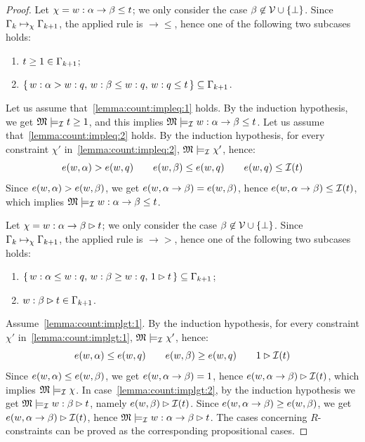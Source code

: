 \begin{proof}
 
 Let $\chi= w:\alpha\to \beta \leq t$; we only consider the case
 $\beta\not\in\mathcal{V}\cup\{\bot\}$.  Since $\Gamma_k\mapsto_{\chi} \Gamma_{k+1}$, the
 applied rule is $\to\leq$, hence one of the following two subcases
 holds:
 
 \begin{enumerate}[label=(B\arabic*), ref=(B\arabic*),leftmargin=*]
 \item\label{lemma:count:impleq:1}
   $t\geq 1\in \Gamma_{k+1}$;
   
 \item\label{lemma:count:impleq:2}
   $\{\,w:\alpha> w :q,\,w:\beta\leq w:q,\,w:q\leq t\,\} \subseteq \Gamma_{k+1}$.
 \end{enumerate}
 Let us assume that~\ref{lemma:count:impleq:1} holds.  By the
 induction hypothesis, we get $\mathfrak{M}\models_{\mathcal{I}} t\geq 1$, and this
 implies $\mathfrak{M}\models_{\mathcal{I}} w:\alpha\to \beta \leq t$.  Let us assume
 that~\ref{lemma:count:impleq:2} holds.  By the induction hypothesis,
 for every constraint $\chi'$ in~\ref{lemma:count:impleq:2},
 $\mathfrak{M}\models_{\mathcal{I}} \chi'$, hence:
 \[
 e(w,\alpha) > e(w,q) \qquad e(w,\beta) \leq e(w,q) \qquad e(w,q) \leq \mathcal{I}(t)
 \]  
 Since $e(w,\alpha) > e(w,\beta)$, we get $e(w,\alpha\to \beta) = e(w,\beta)$, hence
 $e(w,\alpha\to \beta) \leq \mathcal{I}(t)$, which implies $\mathfrak{M}\models_{\mathcal{I}} w:\alpha\to
 \beta \leq t$.


 Let $\chi= w:\alpha\to \beta \rhd t$; we only consider the case
 $\beta\not\in\mathcal{V}\cup\{\bot\}$.  Since $\Gamma_k\mapsto_{\chi} \Gamma_{k+1}$, the
 applied rule is $\to\gt$, hence one of the following two subcases
 holds:
 
 \begin{enumerate}[label=(C\arabic*), ref=(C\arabic*),leftmargin=*]
 \item\label{lemma:count:implgt:1}
   $\{\,w:\alpha \leq w:q,\,w:\beta\geq  w:q,\,1\rhd t\,\}\subseteq\Gamma_{k+1}$;
   
 \item\label{lemma:count:implgt:2}
   $w:\beta\rhd t\in\Gamma_{k+1}$.
 \end{enumerate}
 
 \noindent
 Assume~\ref{lemma:count:implgt:1}.  By the induction hypothesis, for
 every constraint $\chi'$ in~\ref{lemma:count:implgt:1},
 $\mathfrak{M}\models_{\mathcal{I}} \chi'$, hence:
 \[
 e(w,\alpha) \leq  e(w,q) \qquad e(w,\beta) \geq e(w,q) \qquad 1 \rhd \mathcal{I}(t)
 \]  
 Since $e(w,\alpha)\leq e(w,\beta)$, we get $e(w,\alpha\to \beta)=1$, hence
 $e(w,\alpha\to \beta)\rhd \mathcal{I}(t)$, which implies $\mathfrak{M}\models_{\mathcal{I}}\chi$.  In
 case~\ref{lemma:count:implgt:2}, by the induction hypothesis we get
 $\mathfrak{M}\models_{\mathcal{I}} w:\beta\rhd t$, namely $e(w,\beta)\rhd\mathcal{I}(t)$.  Since
 $e(w,\alpha\to\beta)\geq e(w,\beta)$, we get $e(w,\alpha\to\beta)\rhd\mathcal{I}(t)$, hence
 $\mathfrak{M}\models_{\mathcal{I}} w:\alpha\to \beta \rhd t$.  The cases concerning
 $R$-constraints can be proved as the corresponding propositional
 cases.



\end{proof}
